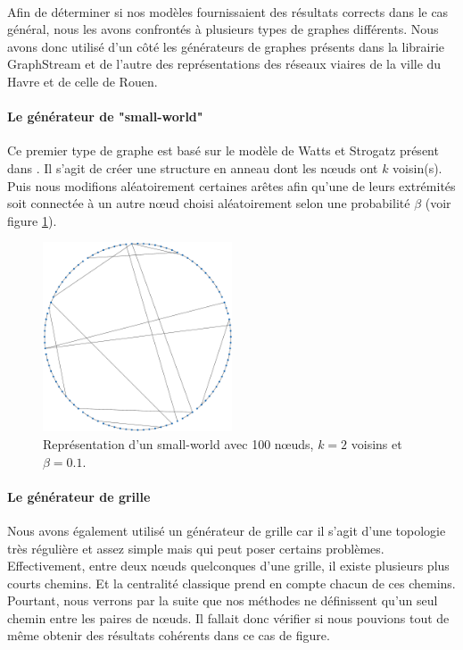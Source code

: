 \documentclass[a4paper, 10pt]{report}
\begin{document}
\paragraph{}Afin de déterminer si nos modèles fournissaient des résultats corrects dans le cas général, nous les avons confrontés à plusieurs types de graphes différents. Nous avons donc utilisé d'un côté les générateurs de graphes présents dans la librairie GraphStream et de l'autre des représentations des réseaux viaires de la ville du Havre et de celle de Rouen.

\paragraph{Le générateur de "small-world"}
Ce premier type de graphe est basé sur le modèle de Watts et Strogatz présent dans \cite{Watts1998Collective}. Il s'agit de créer une structure en anneau dont les n\oe uds ont $k$ voisin(s). Puis nous modifions aléatoirement certaines arêtes afin qu'une de leurs extrémités soit connectée à un autre n\oe ud choisi aléatoirement selon une probabilité $\beta$ (voir figure \ref{fig:screenshot_small_world}).

\begin{figure}[h!]
	\centering
	\includegraphics[width=0.5\textwidth]{./img/screenshot_small_world.pdf}
	\caption{Représentation d'un small-world avec 100 n\oe uds, $k=2$ voisins et $\beta=0.1$.}
	\label{fig:screenshot_small_world}
\end{figure}

\paragraph{Le générateur de grille}Nous avons également utilisé un générateur de grille car il s'agit d'une topologie très régulière et assez simple mais qui peut poser certains problèmes. Effectivement, entre deux n\oe uds quelconques d'une grille, il existe plusieurs plus courts chemins. Et la centralité classique prend en compte chacun de ces chemins. Pourtant, nous verrons par la suite que nos méthodes ne définissent qu'un seul chemin entre les paires de n\oe uds. Il fallait donc vérifier si nous pouvions tout de même obtenir des résultats cohérents dans ce cas de figure.
\end{document}
